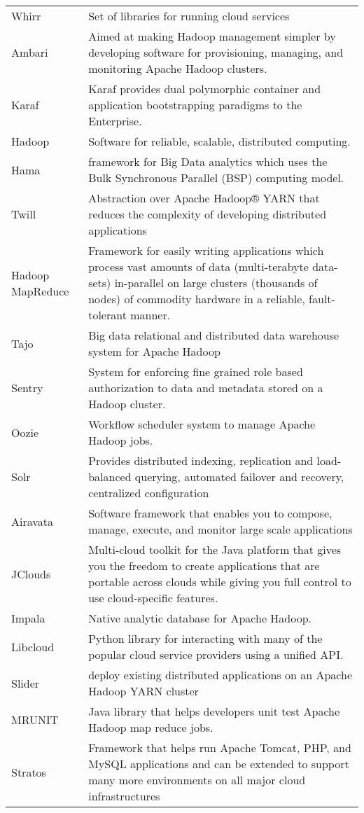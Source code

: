 {\begin{longtable}{|p{2cm} | p{14cm}|}
Whirr & Set of libraries for running cloud services
\\ Ambari & Aimed at making Hadoop management simpler by developing software for provisioning, managing, and monitoring Apache Hadoop clusters.
\\ Karaf & Karaf provides dual polymorphic container and application bootstrapping paradigms to the Enterprise.
\\ Hadoop & Software for reliable, scalable, distributed computing.
\\ Hama & framework for Big Data analytics which uses the Bulk Synchronous Parallel (BSP) computing model.
\\ Twill & Abstraction over Apache Hadoop® YARN that reduces the complexity of developing distributed applications
\\ Hadoop MapReduce & Framework for easily writing applications which process vast amounts of data (multi-terabyte data-sets) in-parallel on large clusters (thousands of nodes) of commodity hardware in a reliable, fault-tolerant manner.
\\ Tajo & Big data relational and distributed data warehouse system for Apache Hadoop
\\ Sentry & System for enforcing fine grained role based authorization to data and metadata stored on a Hadoop cluster.
\\ Oozie & Workflow scheduler system to manage Apache Hadoop jobs.
\\ Solr & Provides distributed indexing, replication and load-balanced querying, automated failover and recovery, centralized configuration
\\ Airavata & Software framework that enables you to compose, manage, execute, and monitor large scale applications
\\ JClouds & Multi-cloud toolkit for the Java platform that gives you the freedom to create applications that are portable across clouds while giving you full control to use cloud-specific features.
\\ Impala & Native analytic database for Apache Hadoop.
\\ Libcloud & Python library for interacting with many of the popular cloud service providers using a unified API.
\\ Slider & deploy existing distributed applications on an Apache Hadoop YARN cluster
\\ MRUNIT & Java library that helps developers unit test Apache Hadoop map reduce jobs.
\\ Stratos &  Framework that helps run Apache Tomcat, PHP, and MySQL applications and can be extended to support many more environments on all major cloud infrastructures

\end{longtable}}
